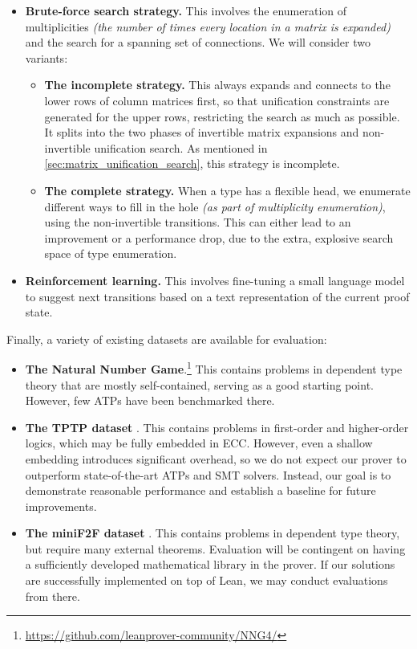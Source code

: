 \documentclass[twoside]{report}
\begin{document}
\begin{itemize}
    \item \textbf{Brute-force search strategy.} This involves the enumeration of multiplicities \emph{(the number of times every location in a matrix is expanded)} and the search for a spanning set of connections. We will consider two variants:
          \begin{itemize}
              \item \textbf{The incomplete strategy.} This always expands and connects to the lower rows of column matrices first, so that unification constraints are generated for the upper rows, restricting the search as much as possible. It splits into the two phases of invertible matrix expansions and non-invertible unification search. As mentioned in \cref{sec:matrix_unification_search}, this strategy is incomplete.

              \item \textbf{The complete strategy.} When a type has a flexible head, we enumerate different ways to fill in the hole \emph{(as part of multiplicity enumeration)}, using the non-invertible transitions. This can either lead to an improvement or a performance drop, due to the extra, explosive search space of type enumeration.
          \end{itemize}

    \item \textbf{Reinforcement learning.} This involves fine-tuning a small language model to suggest next transitions based on a text representation of the current proof state.
\end{itemize}

Finally, a variety of existing datasets are available for evaluation:

\begin{itemize}
    \item \textbf{The Natural Number Game}.\footnote{\url{https://github.com/leanprover-community/NNG4/}} This contains problems in dependent type theory that are mostly self-contained, serving as a good starting point. However, few ATPs have been benchmarked there.

    \item \textbf{The TPTP dataset} \cite{sut17tptp}. This contains problems in first-order and higher-order logics, which may be fully embedded in ECC. However, even a shallow embedding introduces significant overhead, so we do not expect our prover to outperform state-of-the-art ATPs and SMT solvers. Instead, our goal is to demonstrate reasonable performance and establish a baseline for future improvements.

    \item \textbf{The miniF2F dataset} \cite{zheng2021minif2f}. This contains problems in dependent type theory, but require many external theorems. Evaluation will be contingent on having a sufficiently developed mathematical library in the prover. If our solutions are successfully implemented on top of Lean, we may conduct evaluations from there.
\end{itemize}
\end{document}
